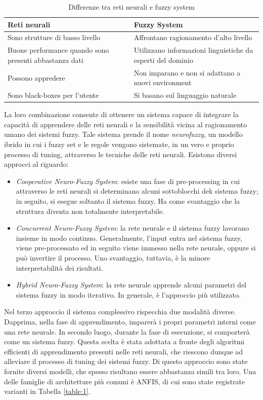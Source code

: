 \documentclass[11pt]{article}
\begin{document}
\begin{table}[h!]
\centering
\begin{tabular}{ |p{7cm}|p{7cm}| } 
\hline
\textbf{Reti neurali} & \textbf{Fuzzy System} \\
\hline
\hline
Sono strutture di basso livello & Affrontano ragionamento d'alto livello\\ 
\hline
Buone performance quando sono presenti abbastanza dati & Utilizzano informazioni linguistiche da esperti del dominio \\
\hline
Possono appredere & Non imparano e non si adattano a nuovi environment \\
\hline
Sono black-boxes per l'utente & Si basano sul linguaggio naturale\\
\hline

\end{tabular}
\caption{Differenze tra reti neurali e fuzzy system}
\label{table:0}
\end{table}

La loro combinazione consente di ottenere un sistema capace di integrare la capacità di apprendere delle reti neurali e la sensibilità vicina al ragionamento umano dei sistemi fuzzy. Tale sistema prende il nome \textit{neurofuzzy}, un modello ibrido in cui i fuzzy set e le regole vengono sistemate, in un vero e proprio processo di tuning, attraverso le tecniche delle reti neurali. 
Esistono diversi approcci al riguardo: 

\begin{itemize}
\item \textit{Cooperative Neuro-Fuzzy System}: esiste una fase di pre-processing in cui attraverso le reti neurali si determinano alcuni sottoblocchi dek sistema fuzzy; in seguito, si esegue soltanto il sistema fuzzy. Ha come svantaggio che la struttura diventa non totalmente interpretabile. 
\item \textit{Concurrent Neuro-Fuzzy System}: la rete neurale e il sistema fuzzy lavorano insieme in modo continuo. Generalmente, l'input entra nel sistema fuzzy, viene pre-processato ed in seguito viene immesso nella rete neurale, oppure si può invertire il processo. Uno svantaggio, tuttavia, è la minore interpretabilità dei risultati. 
\item \textit{Hybrid Neuro-Fuzzy System}: la rete neurale apprende alcuni parametri del sistema fuzzy in modo iterativo. In generale, è l'approccio più utilizzato. 
\end{itemize}

Nel terzo approccio il sistema complessivo rispecchia due modalità diverse. Dapprima, nella fase di apprendimento, imparerà i propri parametri interni come una rete neurale. In secondo luogo, durante la fase di esecuzione, si comporterà come un sistema fuzzy. Questa scelta è stata adottata a fronte degli algoritmi efficienti di apprendimento presenti nelle reti neurali, che riescono dunque ad alleviare il processo di tuning dei sistemi fuzzy. Di questo approccio sono state fornite diversi modelli, che spesso risultano essere abbastanza simili tra loro. Una delle famiglie di architetture più comuni è ANFIS, di cui sono state registrate varianti in Tabella \ref{table:1}.
\end{document}
